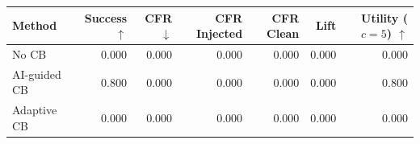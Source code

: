 \begin{tabular}{lrrrrrr}
\toprule
Method & Success $\uparrow$ & CFR $\downarrow$ & CFR Injected & CFR Clean & Lift & Utility ($c=5$) $\uparrow$ \\
\midrule
No CB & 0.000 & 0.000 & 0.000 & 0.000 & 0.000 & 0.000 \\
AI-guided CB & 0.800 & 0.000 & 0.000 & 0.000 & 0.000 & 0.800 \\
Adaptive CB & 0.000 & 0.000 & 0.000 & 0.000 & 0.000 & 0.000 \\
\bottomrule
\end{tabular}
